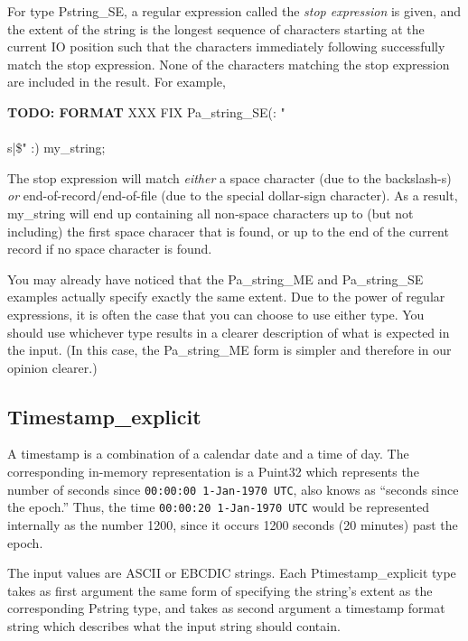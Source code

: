 \aedBegin{}
\aedEnd{}

For type Pstring\_SE, a regular expression called the {\em stop
expression\/} is given, and the extent of the string is the longest
sequence of characters starting at the current IO position such that
the characters immediately following successfully match the stop
expression.  None of the characters matching the stop expression
are included in the result.
For example,
\begin{tinycodeaux}{\leftmargin=0in}
{\bf TODO: FORMAT }
XXX FIX
Pa\_string\_SE(: "\/\\\\s|\$\/" :) my\_string;
\end{tinycodeaux}
The stop expression will match {\em either\/} a space character (due to the backslash-s) {\em or\/}
end-of-record/end-of-file (due to the special dollar-sign character).  As a result,
my\_string will end up containing all non-space characters up to (but not including) the 
first space characer that is found, or up to the end of the current record if no space
character is found.  

You may already have noticed that the Pa\_string\_ME and
Pa\_string\_SE examples actually specify exactly the same extent.  Due
to the power of regular expressions, it is often the case that you can
choose to use either type.  You should use whichever type results in a
clearer description of what is expected in the input.  (In this case,
the Pa\_string\_ME form is simpler and therefore in our opinion
clearer.)

\subsection{Timestamp\_explicit}

\aedBegin{}
\aedEnd{}

A timestamp is a combination of a calendar date and a time of day.
The corresponding in-memory representation is a Puint32 which
represents the number of seconds since {\tt 00:00:00 1-Jan-1970 UTC},
also knows as ``seconds since the epoch.''
Thus, the time {\tt 00:00:20 1-Jan-1970 UTC} would be represented
internally as the number 1200, since it occurs 1200 seconds
(20 minutes) past the epoch.

The input values are ASCII or EBCDIC strings.  Each
Ptimestamp\_explicit type takes as first argument the same form of
specifying the string's extent as the corresponding Pstring type, and
takes as second argument a timestamp format string which describes
what the input string should contain.

